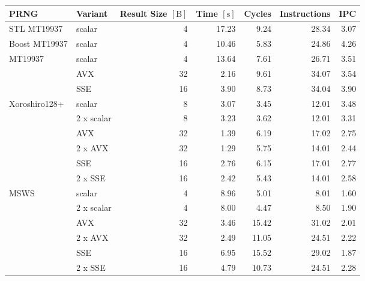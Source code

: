 \documentclass{stdlocal}
\begin{document}
\begin{tabular}{llrrrrr}
  \hline
  \textbf{PRNG} & \textbf{Variant} & \textbf{Result Size} $[\mathrm{B}]$ & \textbf{Time} $[\mathrm{s}]$ & \textbf{Cycles} & \textbf{Instructions} & \textbf{IPC} \\
  \hline
  \hline
  STL MT19937
  & scalar & 4 & 17.23 & 9.24 & 28.34 & 3.07 \\
  \hline
  Boost MT19937
  & scalar & 4 & 10.46 & 5.83 & 24.86 & 4.26 \\
  \hline
  \multirow{3}{*}{MT19937}
  & scalar & 4 & 13.64 & 7.61 & 26.71 & 3.51 \\
  & AVX & 32 & 2.16 & 9.61 & 34.07 & 3.54 \\
  & SSE & 16 & 3.90 & 8.73 & 34.04 & 3.90 \\
  \hline
  \multirow{6}{*}{Xoroshiro128+}
  & scalar & 8 & 3.07 & 3.45 & 12.01 & 3.48 \\
  & 2 x scalar & 8 & 3.23 & 3.62 & 12.01 & 3.31 \\
  & AVX & 32 & 1.39 & 6.19 & 17.02 & 2.75 \\
  & 2 x AVX & 32 & 1.29 & 5.75 & 14.01 & 2.44 \\
  & SSE & 16 & 2.76 & 6.15 & 17.01 & 2.77 \\
  & 2 x SSE & 16 & 2.42 & 5.43 & 14.01 & 2.58 \\
  \hline
  \multirow{6}{*}{MSWS}
  & scalar & 4 & 8.96 & 5.01 & 8.01 & 1.60 \\
  & 2 x scalar & 4 & 8.00 & 4.47 & 8.50 & 1.90 \\
  & AVX & 32 & 3.46 & 15.42 & 31.02 & 2.01 \\
  & 2 x AVX & 32 & 2.49 & 11.05 & 24.51 & 2.22 \\
  & SSE & 16 & 6.95 & 15.52 & 29.02 & 1.87 \\
  & 2 x SSE & 16 & 4.79 & 10.73 & 24.51 & 2.28 \\
  \hline
\end{tabular}
\end{document}
